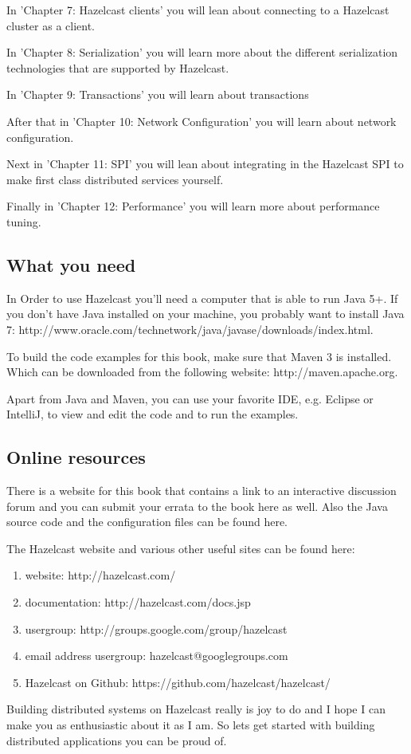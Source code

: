 In 'Chapter 7: Hazelcast clients' you will lean about connecting to a Hazelcast cluster as a client.

In 'Chapter 8: Serialization' you will learn more about the different serialization technologies that are supported by Hazelcast.

In 'Chapter 9: Transactions' you will learn about transactions

After that in 'Chapter 10: Network Configuration' you will learn about network configuration.

Next in 'Chapter 11: SPI' you will lean about integrating in the Hazelcast SPI to make first class distributed services yourself.

Finally in 'Chapter 12: Performance'  you will learn more about performance tuning.  

\subsection*{What you need}
In Order to use Hazelcast you'll need a computer that is able to run Java 5+. If you don't have Java installed on your machine, you probably want to install Java 7: 
http://www.oracle.com/technetwork/java/javase/downloads/index.html. 

To build the code examples for this book, make sure that Maven 3 is installed. Which can be downloaded from the following website: http://maven.apache.org.

Apart from Java and Maven, you can use your favorite IDE, e.g. Eclipse or IntelliJ, to view and edit the code and to run the examples. 

\subsection*{Online resources}
There is a website for this book that contains a link to an interactive discussion forum and you can submit your errata to the book here as well. Also the Java source code and the configuration files can be found here. 

The Hazelcast website and various other useful sites can be found here:
\begin{enumerate}
\item website: http://hazelcast.com/
\item documentation: http://hazelcast.com/docs.jsp
\item usergroup: http://groups.google.com/group/hazelcast
\item email address usergroup: hazelcast@googlegroups.com
\item Hazelcast on Github: https://github.com/hazelcast/hazelcast/
\end{enumerate}
Building distributed systems on Hazelcast really is joy to do and I hope I can make you as enthusiastic about it as I am. So lets get started with building distributed applications you can be proud of.

